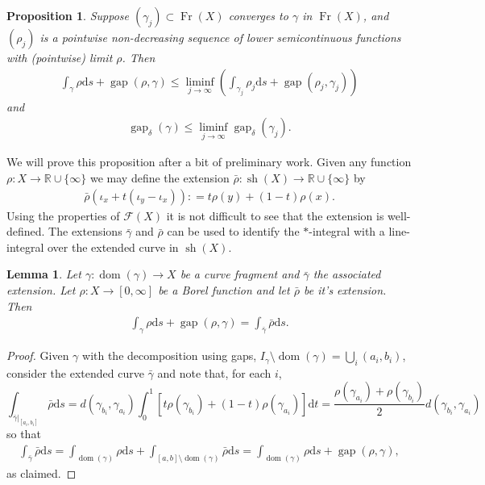 \documentclass{amsart}
\newtheorem{lemma}[theorem]{Lemma}
\newtheorem{proposition}[theorem]{Proposition}
\numberwithin{equation}{section}
\newcommand{\R}{\mathbb{R}}
\newcommand{\F}{\mathcal{F}}
\newcommand{\gap}{\operatorname{gap}}
\newcommand{\dom}{\operatorname{dom}}
\newcommand{\Fr}{\operatorname{Fr}}
\newcommand{\sh}{\operatorname{sh}}
\newcommand{\ud}{\mathrm {d}}
\newcommand{\defl}{\mathrel{\mathop:}=}
\begin{document}
\begin{proposition}\label{prop:liminf}
Suppose $(\gamma_j)\subset \Fr(X)$ converges to $\gamma$ in $\Fr(X)$, and $(\rho_j)$ is a pointwise non-decreasing sequence of lower semicontinuous functions with (pointwise) limit $\rho$. Then
\begin{align*}
\int_\gamma\rho\ud s+\gap(\rho,\gamma)\le \liminf_{j\to\infty}\left(\int_{\gamma_j}\rho_j\ud s+\gap(\rho_j,\gamma_j) \right)
\end{align*}
and 
\begin{align*}
    \gap_\delta(\gamma)\le \liminf_{j\to\infty}\gap_\delta(\gamma_j).
\end{align*}
\end{proposition}
We will prove this proposition after a  bit of preliminary work. Given any function $\rho:X\to \R\cup\{\infty\}$ we may define the extension $\bar \rho:\sh(X)\to \R\cup\{\infty\}$ by
\begin{align*}
\bar \rho(\iota_x+t(\iota_y-\iota_x))\defl t\rho(y)+(1-t)\rho(x).
\end{align*}
Using the properties of $\F(X)$ it is not difficult to see that the extension is well-defined. The extensions $\bar\gamma$ and $\bar\rho$ can be used to identify the $\ast$-integral with a line-integral over the extended curve in $\sh(X)$.

\begin{lemma}\label{lem:line-int}
    Let $\gamma:\dom(\gamma)\to X$ be a curve fragment and $\bar\gamma$ the associated extension. Let $\rho:X\to [0,\infty]$ be a Borel function and let $\bar\rho$ be it's extension. Then 
    \begin{align*}
    \int_{\gamma}\rho\ud s+\gap(\rho,\gamma)=\int_{\bar\gamma}\bar\rho\ud s.
    \end{align*}
\end{lemma}
\begin{proof}
    Given $\gamma$ with the decomposition using gaps, $I_\gamma\setminus \dom(\gamma)=\bigcup_i(a_i,b_i)$, consider the extended curve $\bar\gamma$ and note that, for each $i$, 
    \[
\int_{\bar\gamma|_{[a_i,b_i]}}\bar\rho \ud s=d(\gamma_{b_i},\gamma_{a_i})\int_{0}^{1}[t\rho(\gamma_{b_i})+(1-t)\rho(\gamma_{a_i})]\ud t=\frac{\rho(\gamma_{a_i})+\rho(\gamma_{b_i})}{2}d(\gamma_{b_i},\gamma_{a_i})
    \]
    so that 
\begin{align*}
\int_{\bar\gamma}\bar\rho \ud s=\int_{\dom(\gamma)}\rho\ud s+\int_{[a,b]\setminus\dom(\gamma)}\bar\rho \ud s=\int_{\dom(\gamma)}\rho\ud s + \gap(\rho,\gamma),
\end{align*}
as claimed.
\end{proof}
\end{document}
